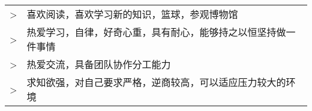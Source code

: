 \renewcommand{\arraystretch}{1.1}

	\begin{tabular}{>{}r>{}p{13cm}} 
		\textsc{>}  		&   喜欢阅读，喜欢学习新的知识，篮球，参观博物馆\\ 
		\textsc{>}          &   热爱学习，自律，好奇心重，具有耐心，能够持之以恒坚持做一件事情\\ 
		\textsc{>}          &   热爱交流，具备团队协作分工能力\\
		\textsc{>}		    &   求知欲强，对自己要求严格，逆商较高，可以适应压力较大的环境\\
	\end{tabular}